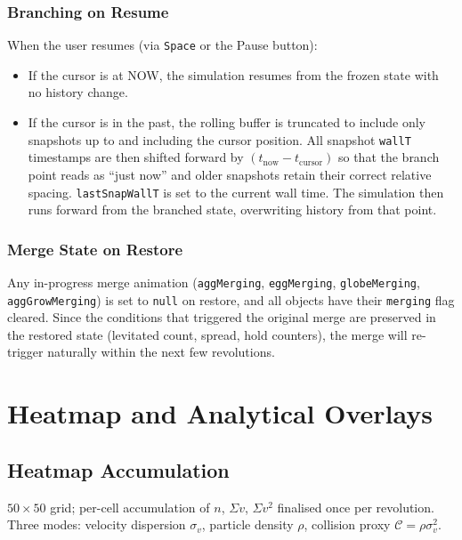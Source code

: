 \documentclass[12pt, a4paper]{article}
\begin{document}
\subsubsection{Branching on Resume}

When the user resumes (via \texttt{Space} or the Pause button):
\begin{itemize}
  \item If the cursor is at NOW, the simulation resumes from the frozen state
    with no history change.
  \item If the cursor is in the past, the rolling buffer is truncated to
    include only snapshots up to and including the cursor position. All
    snapshot \texttt{wallT} timestamps are then shifted forward by
    $(t_{\mathrm{now}} - t_{\mathrm{cursor}})$ so that the branch point reads
    as ``just now'' and older snapshots retain their correct relative spacing.
    \texttt{lastSnapWallT} is set to the current wall time. The simulation then
    runs forward from the branched state, overwriting history from that point.
\end{itemize}

\subsubsection{Merge State on Restore}

Any in-progress merge animation (\texttt{aggMerging}, \texttt{eggMerging},
\texttt{globeMerging}, \texttt{aggGrowMerging}) is set to \texttt{null} on
restore, and all objects have their \texttt{merging} flag cleared. Since the
conditions that triggered the original merge are preserved in the restored
state (levitated count, spread, hold counters), the merge will re-trigger
naturally within the next few revolutions.

\section{Heatmap and Analytical Overlays}

\subsection{Heatmap Accumulation}

$50 \times 50$ grid; per-cell accumulation of $n$, $\Sigma v$, $\Sigma v^2$
finalised once per revolution. Three modes: velocity dispersion $\sigma_v$,
particle density $\rho$, collision proxy $\mathcal{C} = \rho \sigma_v^2$.
\end{document}
